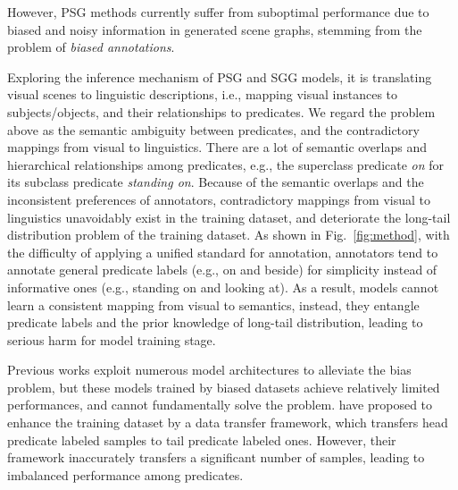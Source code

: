 \documentclass[letterpaper]{article} %
\begin{document}
However, %
PSG methods currently suffer from suboptimal performance due to biased and noisy information in generated scene graphs, stemming from the problem of \emph{biased annotations}. 

Exploring the inference mechanism of PSG and SGG models, it is translating visual scenes to linguistic descriptions, i.e., mapping visual instances to subjects/objects, and their relationships to predicates. We regard the problem above as the semantic ambiguity between predicates, and the contradictory mappings from visual to linguistics. 
There are a lot of semantic overlaps and hierarchical relationships among predicates, e.g., the superclass predicate \textit{on} for its subclass predicate \textit{standing on}. Because of the semantic overlaps and the inconsistent preferences of annotators, contradictory mappings from visual to linguistics unavoidably exist in the training dataset, and deteriorate the long-tail distribution problem of the training dataset. As shown in Fig.~\ref{fig:method}, with the difficulty of applying a unified standard for annotation, annotators tend to annotate general predicate labels (e.g., on and beside) for simplicity instead of informative ones (e.g., standing on and looking at). As a result, models cannot learn a consistent mapping from visual to semantics, instead, they entangle predicate labels and the prior knowledge of long-tail distribution, leading to serious harm for model training stage.


Previous works \cite{Zellers_2018_CVPR,Yu2020CogTreeCT,yao2022pevl,Xu_2017_CVPR,Tang_2019_CVPR,Tang_2020_CVPR,Lin_2020_CVPR} exploit numerous model architectures to alleviate the bias problem, but these models trained by biased datasets achieve relatively limited performances, and cannot fundamentally solve the problem. \citet{zhang2022fine} have proposed to enhance the training dataset by a data transfer framework, which transfers head predicate labeled samples to tail predicate labeled ones. However, their framework inaccurately transfers a significant number of samples, leading to imbalanced performance among predicates.

\end{document}
